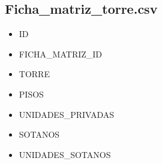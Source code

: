 \documentclass[letterpaper,10pt,spanish]{sphinxmanual}
\begin{document}
\subsection{Ficha\_matriz\_torre.csv}
\label{\detokenize{ETL_SNC/Structure:ficha-matriz-torre-csv}}\begin{itemize}
\item {} 
ID

\item {} 
FICHA\_MATRIZ\_ID

\item {} 
TORRE

\item {} 
PISOS

\item {} 
UNIDADES\_PRIVADAS

\item {} 
SOTANOS

\item {} 
UNIDADES\_SOTANOS

\end{itemize}
\end{document}
